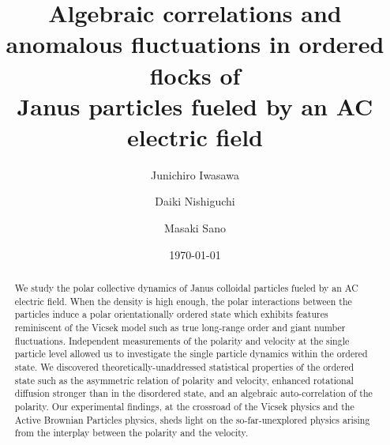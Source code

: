 \documentclass[%
 reprint,
 amsmath,amssymb,
 aps,
 floatfix
]{revtex4-2}
\begin{document}

\title{Algebraic correlations and anomalous fluctuations in ordered flocks of \\Janus particles fueled by an AC electric field}

\author{Junichiro Iwasawa}
\author{Daiki Nishiguchi}
\author{Masaki Sano}
\date{\today}

\begin{abstract}
We study the polar collective dynamics of Janus colloidal particles fueled by an AC electric field.
When the density is high enough, the polar interactions between the particles induce a polar orientationally ordered state which exhibits features reminiscent of the Vicsek model such as true long-range order and giant number fluctuations.
Independent measurements of the polarity and velocity at the single particle level allowed us to investigate the single particle dynamics within the ordered state.
We discovered theoretically-unaddressed statistical properties of the ordered state such as the asymmetric relation of polarity and velocity, enhanced rotational diffusion stronger than in the disordered state, and an algebraic auto-correlation of the polarity.
Our experimental findings, at the crossroad of the Vicsek physics and the Active Brownian Particles physics, sheds light on the so-far-unexplored physics arising from the interplay between the polarity and the velocity.
\end{abstract}
\maketitle
\end{document}
